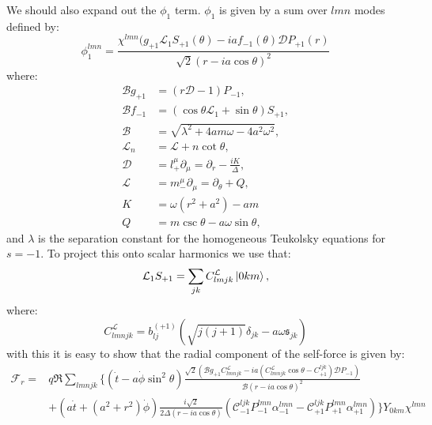 \documentclass[preprint,showpacs,preprintnumbers,amssymb,superscriptaddress,aps,prd,nofootinbib,11pt]{revtex4-1}
\begin{document}
We should also expand out the $\phi_1$ term. $\phi_1$ is given by a sum over $lmn$ modes defined by:
\begin{equation}
    \phi_1^{lmn} = \frac{\chi^{lmn}(g_{+1} \mathcal{L}_1 S_{+1}(\theta) - ia f_{-1}(\theta) \mathcal{D}P_{+1}(r)}{\sqrt{2} (r-ia\cos\theta)^2}
\end{equation}
where:
\begin{align}
    \mathcal{B} g_{+1} &= (r\mathcal{D}-1)P_{-1},\\
    \mathcal{B} f_{-1} &= (\cos \theta \mathcal{L}_1 + \sin\theta) S_{+1},\\
    \mathcal{B} &= \sqrt{\lambda^2 + 4 am \omega - 4 a^2 \omega^2},\\
    \mathcal{L}_n &= \mathcal{L} + n \cot\theta,\\
    \mathcal{D} &= l^\mu_+ \partial_\mu = \partial_r - \frac{iK}{\Delta},\\
    \mathcal{L} &= m^\mu_- \partial_\mu = \partial_\theta + Q,\\
    K&=\omega(r^2 +a^2) -am\\
    Q&=m \csc \theta -a \omega \sin \theta,
\end{align}
and $\lambda$ is the separation constant for the homogeneous Teukolsky equations for $s=-1$. To project this onto scalar harmonics we use that\cite{TorresDolan2022}:
\begin{equation}
    \mathcal{L}_1 S_{+1} = \sum\limits_{jk} C^\mathcal{L}_{lmjk} \ket{0km},
\end{equation}
where:
\begin{equation}
    C^\mathcal{L}_{lmnjk} = b_{lj}^{(+1)}\left(\sqrt{j(j+1)} \delta_{jk} - a \omega \mathfrak{s}_{jk}\right)
\end{equation}
with this it is easy to show that the radial component of the self-force is given by:
\begin{align}
    \mathcal{F}_r =& q\Re\sum\limits_{lmnjk}\Bigg\{(\dot{t}- a\dot{\phi} \sin^2\theta) \frac{\sqrt{2} \left(\mathcal{B} g_{+1} C^\mathcal{L}_{lmnjk} - ia \left(C^\mathcal{L}_{lmnjk} \cos\theta - C^{ljk}_{+1}\right)\mathcal{D} P_{-1}\right)}{\mathcal{B} (r-ia\cos\theta)^2} \nonumber\\
    &+ \left(a \dot{t} + (a^2 +r^2)\dot{\phi} \right)\frac{i\sqrt{2} }{2 \Delta(r-ia \cos \theta) } \left(\mathcal{C}^{ljk}_{-1} P^{lmn}_{-1} \alpha^{lmn}_{-1} - \mathcal{C}^{ljk}_{+1} P^{lmn}_{+1} \alpha^{lmn}_{+1}\right) \Bigg\}Y_{0km}\chi^{lmn}
\end{align}
\end{document}
